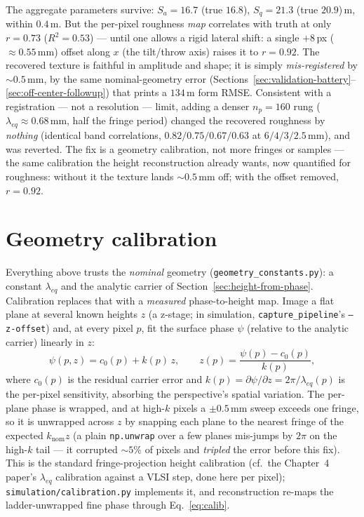 \documentclass[11pt]{article}
\begin{document}
The aggregate parameters survive: $S_a=16.7$ (true $16.8$), $S_q=21.3$
(true $20.9$)\,\textmu m, within $0.4$\,\textmu m. But the per-pixel
roughness \emph{map} correlates with truth at only $r=0.73$ ($R^2=0.53$)
--- until one allows a rigid lateral shift: a single $+8$\,px
($\approx0.55$\,mm) offset along $x$ (the tilt/throw axis) raises it to
$r=0.92$. The recovered texture is faithful in amplitude and shape; it is
simply \emph{mis-registered} by $\sim\!0.5$\,mm, by the same
nominal-geometry error
(Sections~\ref{sec:validation-battery}--\ref{sec:off-center-followup}) that
prints a $134$\,\textmu m form RMSE. Consistent with a registration --- not
a resolution --- limit, adding a denser $n_p=160$ rung
($\lambda_{eq}\approx0.68$\,mm, half the fringe period) changed the
recovered roughness by \emph{nothing} (identical band correlations,
$0.82/0.75/0.67/0.63$ at $6/4/3/2.5$\,mm), and was reverted. The fix is a
geometry calibration, not more fringes or samples --- the same calibration
the height reconstruction already wants, now quantified for roughness:
without it the texture lands $\sim\!0.5$\,mm off; with the offset removed,
$r=0.92$.

\section{Geometry calibration}
\label{sec:calibration}

Everything above trusts the \emph{nominal} geometry
(\texttt{geometry\_constants.py}): a constant $\lambda_{eq}$ and the analytic
carrier of Section~\ref{sec:height-from-phase}. Calibration replaces that with a
\emph{measured} phase-to-height map. Image a flat plane at several known heights
$z$ (a z-stage; in simulation, \texttt{capture\_pipeline}'s \texttt{--z-offset})
and, at every pixel $p$, fit the surface phase $\psi$ (relative to the analytic
carrier) linearly in $z$:
\begin{equation}
  \psi(p,z) = c_0(p) + k(p)\,z, \qquad
  z(p) = \frac{\psi(p) - c_0(p)}{k(p)} ,
  \label{eq:calib}
\end{equation}
where $c_0(p)$ is the residual carrier error and $k(p)=\partial\psi/\partial z =
2\pi/\lambda_{eq}(p)$ is the per-pixel sensitivity, absorbing the perspective's
spatial variation. The per-plane phase is wrapped, and at high-$k$ pixels a
$\pm0.5$\,mm sweep exceeds one fringe, so it is unwrapped across $z$ by snapping
each plane to the nearest fringe of the expected $k_{\text{nom}}z$ (a plain
\texttt{np.unwrap} over a few planes mis-jumps by $2\pi$ on the high-$k$ tail ---
it corrupted $\sim\!5\%$ of pixels and \emph{tripled} the error before this fix).
This is the standard fringe-projection height calibration (cf.\ the Chapter~4
paper's $\lambda_{eq}$ calibration against a VLSI step, done here per pixel);
\texttt{simulation/calibration.py} implements it, and reconstruction re-maps the
ladder-unwrapped fine phase through Eq.~\ref{eq:calib}.
\end{document}
